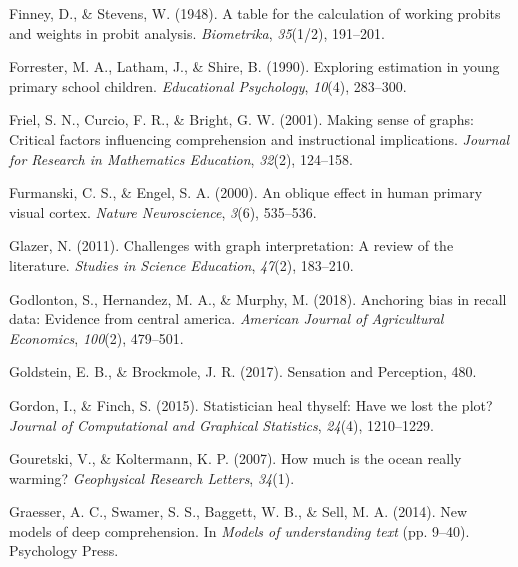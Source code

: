 \documentclass[print]{nuthesis}
\newlength{\cslhangindent}
\newenvironment{CSLReferences}[2]%
{\setlength{\parindent}{0pt}%
\everypar{\setlength{\hangindent}{\cslhangindent}}\ignorespaces}%
{\par}
\begin{document}
\begin{CSLReferences}{1}{0}
\leavevmode{}%
Finney, D., \& Stevens, W. (1948). A table for the calculation of working probits and weights in probit analysis. \emph{Biometrika}, \emph{35}(1/2), 191--201.

\leavevmode{}%
Forrester, M. A., Latham, J., \& Shire, B. (1990). Exploring estimation in young primary school children. \emph{Educational Psychology}, \emph{10}(4), 283--300.

\leavevmode{}%
Friel, S. N., Curcio, F. R., \& Bright, G. W. (2001). Making sense of graphs: Critical factors influencing comprehension and instructional implications. \emph{Journal for Research in Mathematics Education}, \emph{32}(2), 124--158.

\leavevmode{}%
Furmanski, C. S., \& Engel, S. A. (2000). An oblique effect in human primary visual cortex. \emph{Nature Neuroscience}, \emph{3}(6), 535--536.

\leavevmode{}%
Glazer, N. (2011). Challenges with graph interpretation: A review of the literature. \emph{Studies in Science Education}, \emph{47}(2), 183--210.

\leavevmode{}%
Godlonton, S., Hernandez, M. A., \& Murphy, M. (2018). Anchoring bias in recall data: Evidence from central america. \emph{American Journal of Agricultural Economics}, \emph{100}(2), 479--501.

\leavevmode{}%
Goldstein, E. B., \& Brockmole, J. R. (2017). Sensation and {Perception}, 480.

\leavevmode{}%
Gordon, I., \& Finch, S. (2015). Statistician heal thyself: Have we lost the plot? \emph{Journal of Computational and Graphical Statistics}, \emph{24}(4), 1210--1229.

\leavevmode{}%
Gouretski, V., \& Koltermann, K. P. (2007). How much is the ocean really warming? \emph{Geophysical Research Letters}, \emph{34}(1).

\leavevmode{}%
Graesser, A. C., Swamer, S. S., Baggett, W. B., \& Sell, M. A. (2014). New models of deep comprehension. In \emph{Models of understanding text} (pp. 9--40). Psychology Press.


\end{CSLReferences}
\end{document}
